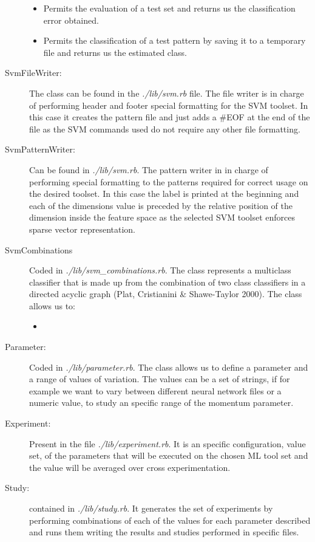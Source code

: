 \documentclass[a4paper,10pt,titlepage]{article}
\begin{document}
\begin{description}
\begin{itemize}
		\item Permits the evaluation of a test set and returns us the classification error obtained.
		\item Permits the classification of a test pattern by saving it to a temporary file and returns us the estimated class.
	\end{itemize}
	\item[SvmFileWriter:] The class can be found in the \textit{./lib/svm.rb} file. The file writer is in charge of performing header and footer special formatting for the SVM toolset. In this case it creates the pattern file and just adds a #EOF at the end of the file as the SVM commands used do not require any other file formatting.
	\item[SvmPatternWriter:] Can be found in \textit{./lib/svm.rb}. The pattern writer in in charge of performing special formatting to the patterns required for correct usage on the desired toolset. In this case the label is printed at the beginning and each of the dimensions value is preceded by the relative position of the dimension inside the feature space as the selected SVM toolset enforces sparse vector representation.
	\item[SvmCombinations] Coded in \textit{./lib/svm\_combinations.rb}. The class represents a multiclass classifier that is made up from the combination of two class classifiers in a directed acyclic graph (Plat, Cristianini & Shawe-Taylor 2000). The class allows us to:
	\begin{itemize}
		\item 
	\end{itemize}
	
	
	\item[Parameter:] Coded in \textit{./lib/parameter.rb}. The class allows us to define a parameter and a range of values of variation. The values can be a set of strings, if for example we want to vary between different neural network files or a numeric value, to study an specific range of the momentum parameter. 
	\item[Experiment:] Present in the file \textit{./lib/experiment.rb}. It is an specific configuration, value set, of the parameters that will be executed on the chosen ML tool set and the value will be averaged over cross experimentation. 
	\item[Study:] contained in \textit{./lib/study.rb}. It generates the set of experiments by performing combinations of each of the values for each parameter described and runs them writing the results and studies performed in specific files. 
\end{description}
\end{document}
